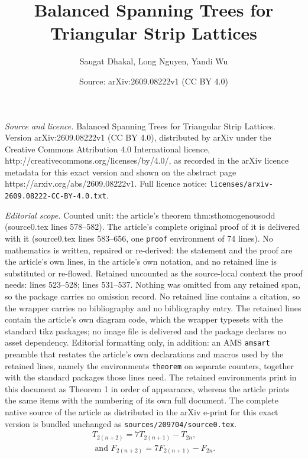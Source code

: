 \documentclass[10pt,a4paper]{amsart}
\title{Balanced Spanning Trees for Triangular Strip Lattices}
\author{Saugat Dhakal, Long Nguyen, Yandi Wu}
\date{Source: arXiv:2609.08222v1 (CC BY 4.0)}
\begin{document}
\maketitle

\noindent\emph{Source and licence.} Balanced Spanning Trees for Triangular Strip Lattices. Version arXiv:2609.08222v1 (CC BY 4.0), distributed by arXiv under the Creative Commons Attribution 4.0 International licence, http://creativecommons.org/licenses/by/4.0/, as recorded in the arXiv licence metadata for this exact version and shown on the abstract page https://arxiv.org/abs/2609.08222v1. Full licence notice: \texttt{licenses/arxiv-2609.08222-CC-BY-4.0.txt}.\par\smallskip

\noindent\textit{Editorial scope.} Counted unit: the article's theorem thm:sthomogenousodd (source0.tex lines 578--582). The article's complete original proof of it is delivered with it (source0.tex lines 583--656, one \texttt{proof} environment of 74 lines). No mathematics is written, repaired or re-derived: the statement and the proof are the article's own lines, in the article's own notation, and no retained line is substituted or re-flowed.  Retained uncounted as the source-local context the proof needs: lines 523--528; lines 531--537.  Nothing was omitted from any retained span, so the package carries no omission record.  No retained line contains a citation, so the wrapper carries no bibliography and no bibliography entry.  The retained lines contain the article's own diagram code, which the wrapper typesets with the standard tikz packages; no image file is delivered and the package declares no asset dependency.  Editorial formatting only, in addition: an AMS \texttt{amsart} preamble that restates the article's own declarations and macros used by the retained lines, namely the environments \texttt{theorem} on separate counters, together with the standard packages those lines need.  The retained environments print in this document as Theorem 1 in order of appearance, whereas the article prints the same items with the numbering of its own full document.  The complete native source of the article as distributed in the arXiv e-print for this exact version is bundled unchanged as \texttt{sources/209704/source0.tex}.
\begin{equation}\label{eqn:recurrencerelationspanningtree} 
    \begin{aligned}
    T_{2(n+2)} = 7T_{2(n+1)} - T_{2n},\\
    \text{ and } F_{2(n+2)} = 7F_{2(n+1)} - F_{2n}.
    \end{aligned}
\end{equation}
\end{document}
